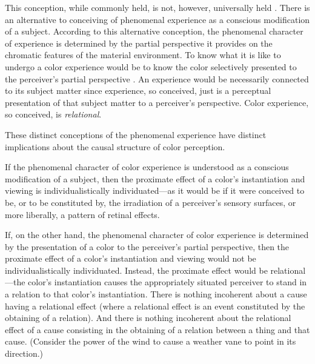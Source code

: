 \documentclass[12pt]{article}
\begin{document}
This conception, while commonly held, is not, however, universally held \cite[for criticism see][]{Campbell:2002ve,Kalderon:2008fk,Martin:1998nx}. There is an alternative to conceiving of phenomenal experience as a conscious modification of a subject. According to this alternative conception, the phenomenal character of experience is determined by the partial perspective it provides on the chromatic features of the material environment. To know what it is like to undergo a color experience would be to know the color selectively presented to the perceiver's partial perspective \citep[see][166, 172, 173--4]{Nagel:1979fk}. An experience would be necessarily connected to its subject matter since experience, so conceived, just is a perceptual presentation of that subject matter to a perceiver's perspective. Color experience, so conceived, is \emph{relational}.

These distinct conceptions of the phenomenal experience have distinct implications about the causal structure of color perception. 

If the phenomenal character of color experience is understood as a conscious modification of a subject, then the proximate effect of a color's instantiation and viewing is individualistically individuated---as it would be if it were conceived to be, or to be constituted by, the irradiation of a perceiver's sensory surfaces, or more liberally, a pattern of retinal effects. 

If, on the other hand, the phenomenal character of color experience is determined by the presentation of a color to the perceiver's partial perspective, then the proximate effect of a color's instantiation and viewing would not be individualistically individuated. Instead, the proximate effect would be relational---the color's instantiation causes the appropriately situated perceiver to stand in a relation to that color's instantiation. There is nothing incoherent about a cause having a relational effect (where a relational effect is an event constituted by the obtaining of a relation). And there is nothing incoherent about the relational effect of a cause consisting in the obtaining of a relation between a thing and that cause. (Consider the power of the wind to cause a weather vane to point in its direction.)
\end{document}
